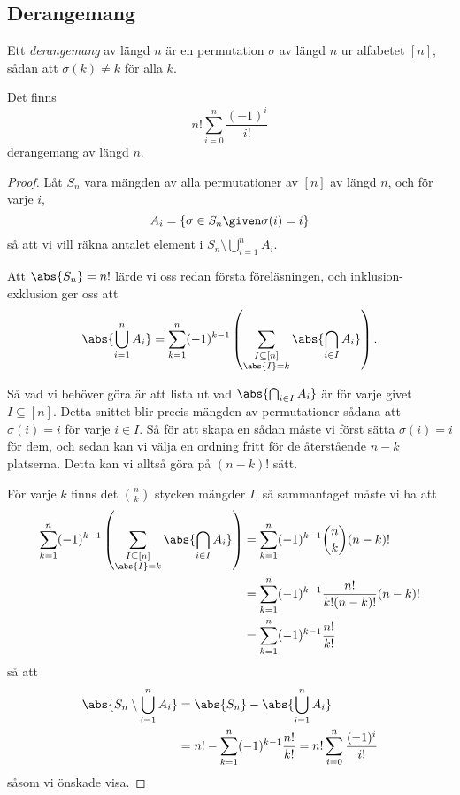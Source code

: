 \documentclass[nobib]{tufte-handout}
\begin{document}
\subsection{Derangemang}

\begin{definition}
  Ett \emph{derangemang} av längd $n$ är en permutation $\sigma$ av längd $n$ ur alfabetet $[n]$, sådan att $\sigma(k) \neq k$ för alla $k$.
\end{definition}

\begin{theorem}
  Det finns
  $$n!\sum_{i=0}^{n} \frac{(-1)^i}{i!}$$
  derangemang av längd $n$.

  \begin{proof}
    Låt $S_n$ vara mängden av alla permutationer av $[n]$ av längd $n$, och för varje $i$,
    $$A_i = \left\{\sigma \in S_n \given \sigma(i) = i\right\}$$
    så att vi vill räkna antalet element i $S_n \setminus \bigcup_{i=1}^n A_i$.

    Att $\abs{S_n} = n!$ lärde vi oss redan första föreläsningen, och inklusion-exklusion ger oss att
    $$\abs{\bigcup_{i=1}^n A_i} = \sum_{k=1}^{n} (-1)^{k-1}\left(\sum_{\substack{I \subseteq [n]\\\abs{I} = k}} \abs{\bigcap_{i \in I} A_i}\right).$$

    Så vad vi behöver göra är att lista ut vad $\abs{\bigcap_{i \in I} A_i}$ är för varje givet $I \subseteq [n]$. Detta snittet blir precis mängden av permutationer sådana att $\sigma(i) = i$ för varje $i\in I$. Så för att skapa en sådan måste vi först sätta $\sigma(i) = i$ för dem, och sedan kan vi välja en ordning fritt för de återstående $n-k$ platserna. Detta kan vi alltså göra på $(n-k)!$ sätt.

    För varje $k$ finns det $\binom{n}{k}$ stycken mängder $I$, så sammantaget måste vi ha att 
    \begin{align*}
      \sum_{k=1}^{n} (-1)^{k-1}\left(\sum_{\substack{I \subseteq [n]\\\abs{I} = k}} \abs{\bigcap_{i \in I} A_i}\right) &= \sum_{k=1}^{n} (-1)^{k-1}\binom{n}{k} (n-k)!\\
      &= \sum_{k=1}^{n} (-1)^{k-1}\frac{n!}{k!(n-k)!}(n-k)!\\
      &= \sum_{k=1}^{n} (-1)^{k-1}\frac{n!}{k!}
    \end{align*}
    så att
    \begin{align*}
      \abs{S_n \setminus \bigcup_{i=1}^n A_i} &= \abs{S_n} - \abs{\bigcup_{i=1}^n A_i}\\
      &= n! - \sum_{k=1}^{n} (-1)^{k-1}\frac{n!}{k!} = n!\sum_{i=0}^{n} \frac{(-1)^i}{i!}
    \end{align*}
    såsom vi önskade visa.
  \end{proof}
\end{theorem}
\end{document}
